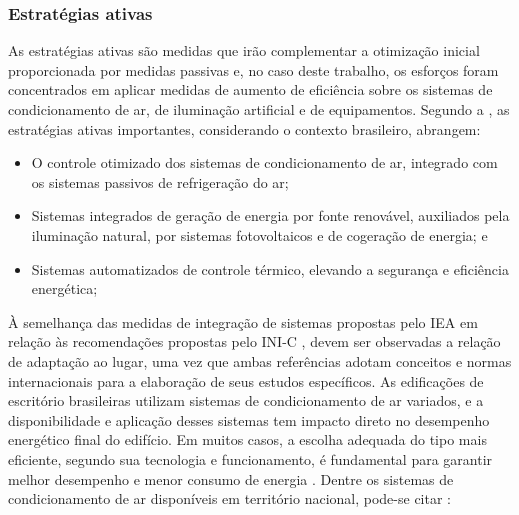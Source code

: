 \subsubsection{Estratégias ativas}
As estratégias ativas são medidas que irão complementar a otimização inicial proporcionada 
por medidas passivas e, no caso deste trabalho, os esforços foram concentrados em aplicar 
medidas de aumento de eficiência sobre os sistemas de condicionamento de ar, de iluminação 
artificial e de equipamentos. Segundo a \textit{\textcite{InternationalEnergyAgency-IEA2014}}, as 
estratégias ativas importantes, considerando o contexto brasileiro, abrangem:
    \begin{itemize}
        \item O controle otimizado dos sistemas de condicionamento de ar, integrado com os 
        sistemas passivos de refrigeração do ar;
        \item Sistemas integrados de geração de energia por fonte renovável, auxiliados pela 
        iluminação natural, por sistemas fotovoltaicos e de cogeração de energia; e
        \item Sistemas automatizados de controle térmico, elevando a segurança e eficiência 
        energética;
    \end{itemize}
À semelhança das medidas de integração de sistemas propostas pelo IEA em relação às 
recomendações propostas pelo INI-C \cite{InstitutoNacionaldeMetrologiaNormalizacaoeQualidadeIndustrial-INMETRO2018}, devem ser observadas a relação de adaptação ao 
lugar, uma vez que ambas referências adotam conceitos e normas internacionais para a 
elaboração de seus estudos específicos.\vspace*{0.3cm} \newline
As edificações de escritório brasileiras utilizam sistemas de condicionamento de ar 
variados, e a disponibilidade e aplicação desses sistemas tem impacto direto no 
desempenho energético final do edifício. Em muitos casos, a escolha adequada do tipo 
mais eficiente, segundo sua tecnologia e funcionamento, é fundamental para garantir 
melhor desempenho e menor consumo de energia \cite{Kamal2019,Shin2019}. 
Dentre os sistemas de condicionamento de ar disponíveis em território nacional, 
pode-se citar \cite{ConselhoBrasileirodeConstrucaoSustentavel-CBCS2015}:
